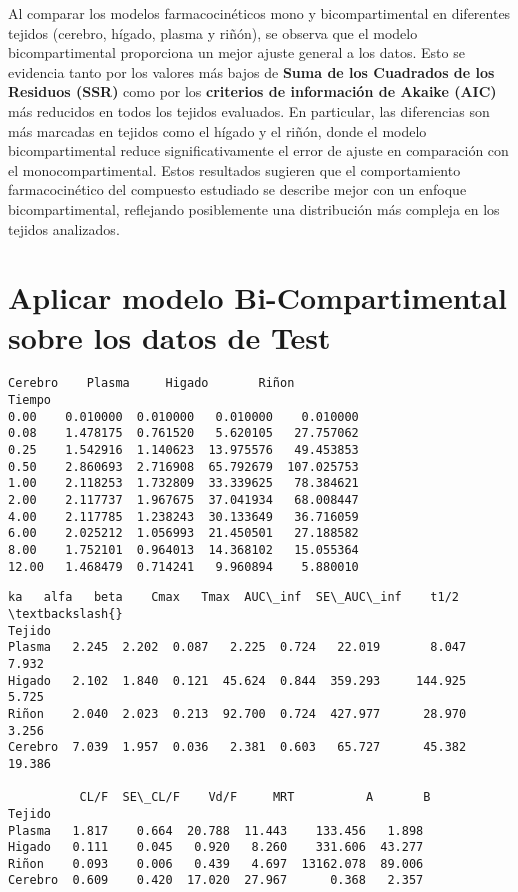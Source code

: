 \documentclass[11pt]{article}
\begin{document}
    Al comparar los modelos farmacocinéticos mono y bicompartimental en
diferentes tejidos (cerebro, hígado, plasma y riñón), se observa que el
modelo bicompartimental proporciona un mejor ajuste general a los datos.
Esto se evidencia tanto por los valores más bajos de \textbf{Suma de los
Cuadrados de los Residuos (SSR)} como por los \textbf{criterios de
información de Akaike (AIC)} más reducidos en todos los tejidos
evaluados. En particular, las diferencias son más marcadas en tejidos
como el hígado y el riñón, donde el modelo bicompartimental reduce
significativamente el error de ajuste en comparación con el
monocompartimental. Estos resultados sugieren que el comportamiento
farmacocinético del compuesto estudiado se describe mejor con un enfoque
bicompartimental, reflejando posiblemente una distribución más compleja
en los tejidos analizados.

    \section{Aplicar modelo Bi-Compartimental sobre los datos de
Test}\label{aplicar-modelo-bi-compartimental-sobre-los-datos-de-test}

    \begin{Verbatim}[commandchars=\\\{\}]
         Cerebro    Plasma     Higado       Riñon
Tiempo
0.00    0.010000  0.010000   0.010000    0.010000
0.08    1.478175  0.761520   5.620105   27.757062
0.25    1.542916  1.140623  13.975576   49.453853
0.50    2.860693  2.716908  65.792679  107.025753
1.00    2.118253  1.732809  33.339625   78.384621
2.00    2.117737  1.967675  37.041934   68.008447
4.00    2.117785  1.238243  30.133649   36.716059
6.00    2.025212  1.056993  21.450501   27.188582
8.00    1.752101  0.964013  14.368102   15.055364
12.00   1.468479  0.714241   9.960894    5.880010
    \end{Verbatim}

    \begin{Verbatim}[commandchars=\\\{\}]
            ka   alfa   beta    Cmax   Tmax  AUC\_inf  SE\_AUC\_inf    t1/2  \textbackslash{}
Tejido
Plasma   2.245  2.202  0.087   2.225  0.724   22.019       8.047   7.932
Higado   2.102  1.840  0.121  45.624  0.844  359.293     144.925   5.725
Riñon    2.040  2.023  0.213  92.700  0.724  427.977      28.970   3.256
Cerebro  7.039  1.957  0.036   2.381  0.603   65.727      45.382  19.386

          CL/F  SE\_CL/F    Vd/F     MRT          A       B
Tejido
Plasma   1.817    0.664  20.788  11.443    133.456   1.898
Higado   0.111    0.045   0.920   8.260    331.606  43.277
Riñon    0.093    0.006   0.439   4.697  13162.078  89.006
Cerebro  0.609    0.420  17.020  27.967      0.368   2.357
    \end{Verbatim}
\end{document}
